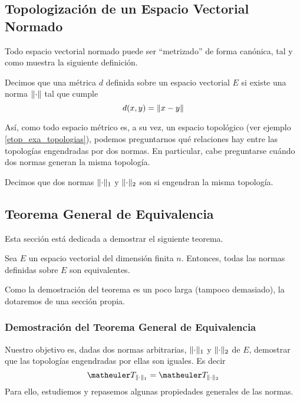 \subsection{Topologización de un Espacio Vectorial Normado}
Todo espacio vectorial normado puede ser ``metrizado'' de forma canónica, tal y como muestra la siguiente definición.
\begin{defi}
	Decimos que una métrica $d$ definida sobre un espacio vectorial $E$  si existe una norma $\lVert\cdot\rVert$ tal que cumple
	\begin{equation*}
		d(x,y)=\lVert x-y\rVert
	\end{equation*}
\end{defi}
Así, como todo espacio métrico es, a su vez, un espacio topológico (ver ejemplo \ref{etop_exa_topologias}), podemos preguntarnos qué relaciones hay entre las topologías engendradas por dos normas. En particular, cabe preguntarse cuándo dos normas generan la misma topología.
\begin{defi}
	Decimos que dos normas $\lVert\cdot\rVert_1$ y $\lVert\cdot\rVert_2$ son  si engendran la misma topología.
\end{defi}
\subsection{Teorema General de Equivalencia}
Esta sección está dedicada a demostrar el siguiente teorema.
\begin{theo}
	Sea $E$ un espacio vectorial del dimensión finita $n$. Entonces, todas las normas definidas sobre $E$ son equivalentes.
\end{theo}
Como la demostración del teorema es un poco larga (tampoco demasiado), la dotaremos de una sección propia.
\subsubsection{Demostración del Teorema General de Equivalencia}
Nuestro objetivo es, dadas dos normas arbitrarias, $\lVert\cdot\rVert_1$ y $\lVert\cdot\rVert_2$ de $E$, demostrar que las topologías engendradas por ellas son iguales. Es decir
\begin{equation*}
\T_{\norm{\cdot}_1}=\T_{\norm{\cdot}_2}
\end{equation*}
Para ello, estudiemos y repasemos algunas propiedades generales de las normas.

